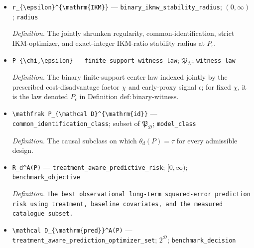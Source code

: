 \documentclass{article}
\begin{document}
\begin{itemize}
  \item \texttt{r\_\allowbreak{}\{\textbackslash{}\allowbreak{}epsilon\}\allowbreak{}\textasciicircum{}\{\textbackslash{}\allowbreak{}mathrm\{IKM\}\allowbreak{}\}\allowbreak{}} --- \texttt{binary\_\allowbreak{}ikmw\_\allowbreak{}stability\_\allowbreak{}radius}; \((0,\infty)\); \texttt{radius}
  \par\smallskip\noindent\emph{Definition.} The jointly shrunken regularity, common-identification, strict IKM-optimizer, and exact-integer IKM-ratio stability radius at \(P_\epsilon\).
  \item \texttt{P\_\allowbreak{}\{\textbackslash{}\allowbreak{}chi,\allowbreak{}\textbackslash{}\allowbreak{}epsilon\}\allowbreak{}} --- \texttt{finite\_\allowbreak{}support\_\allowbreak{}witness\_\allowbreak{}law}; \(\mathfrak P_{\mathcal D}\); \texttt{witness\_\allowbreak{}law}
  \par\smallskip\noindent\emph{Definition.} The binary finite-support center law indexed jointly by the prescribed cost-disadvantage factor \(\chi\) and early-proxy signal \(\epsilon\); for fixed \(\chi\), it is the law denoted \(P_\epsilon\) in Definition \(\mathrm{def{:}binary\text{-}witness}\).
  \item \texttt{\textbackslash{}\allowbreak{}mathfrak P\_\allowbreak{}\{\textbackslash{}\allowbreak{}mathcal D\}\allowbreak{}\textasciicircum{}\{\textbackslash{}\allowbreak{}mathrm\{id\}\allowbreak{}\}\allowbreak{}} --- \texttt{common\_\allowbreak{}identification\_\allowbreak{}class}; subset of \(\mathfrak P_{\mathcal D}\); \texttt{model\_\allowbreak{}class}
  \par\smallskip\noindent\emph{Definition.} The causal subclass on which \(\theta_d(P)=\tau\) for every admissible design.
  \item \texttt{R\_\allowbreak{}d\textasciicircum{}A(P)} --- \texttt{treatment\_\allowbreak{}aware\_\allowbreak{}predictive\_\allowbreak{}risk}; \([0,\infty)\); \texttt{benchmark\_\allowbreak{}objective}
  \par\smallskip\noindent\emph{Definition.} \texttt{The best observational long-\allowbreak{}term squared-\allowbreak{}error prediction risk using treatment,\allowbreak{} baseline covariates,\allowbreak{} and the measured catalogue subset.}
  \item \texttt{\textbackslash{}\allowbreak{}mathcal D\_\allowbreak{}\{\textbackslash{}\allowbreak{}mathrm\{pred\}\allowbreak{}\}\allowbreak{}\textasciicircum{}A(P)} --- \texttt{treatment\_\allowbreak{}aware\_\allowbreak{}prediction\_\allowbreak{}optimizer\_\allowbreak{}set}; \(2^{\mathcal D}\); \texttt{benchmark\_\allowbreak{}decision}

\end{itemize}
\end{document}
